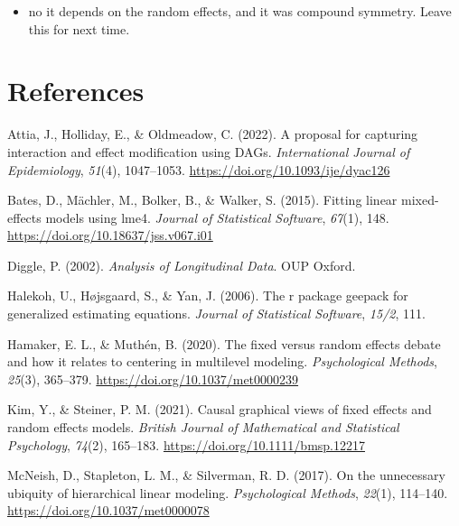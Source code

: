\documentclass[
  12pt,
  a4paper,
]{article}
\providecommand{\tightlist}{%
  \setlength{\itemsep}{0pt}\setlength{\parskip}{0pt}}\usepackage{longtable,booktabs,array}
\newlength{\cslhangindent}
\newenvironment{CSLReferences}[2] %
 {\begin{list}{}{%
  \setlength{\itemindent}{0pt}
  \setlength{\leftmargin}{0pt}
  \setlength{\parsep}{0pt}
  \ifodd #1
   \setlength{\leftmargin}{\cslhangindent}
   \setlength{\itemindent}{-1\cslhangindent}
  \fi
  \setlength{\itemsep}{#2\baselineskip}}}
 {\end{list}}
\begin{document}
\begin{itemize}
  \begin{itemize}
  \tightlist
  \item
    no it depends on the random effects, and it was compound symmetry.
    Leave this for next time.
  \end{itemize}
\end{itemize}

\newpage

\section{References}\label{references}

\label{refs}
\begin{CSLReferences}{1}{0}
Attia, J., Holliday, E., \& Oldmeadow, C. (2022). A proposal for
capturing interaction and effect modification using DAGs.
\emph{International Journal of Epidemiology}, \emph{51}(4), 1047--1053.
\url{https://doi.org/10.1093/ije/dyac126}

Bates, D., Mächler, M., Bolker, B., \& Walker, S. (2015). Fitting linear
mixed-effects models using {lme4}. \emph{Journal of Statistical
Software}, \emph{67}(1), 148.
\url{https://doi.org/10.18637/jss.v067.i01}

Diggle, P. (2002). \emph{Analysis of Longitudinal Data}. OUP Oxford.

Halekoh, U., Højsgaard, S., \& Yan, J. (2006). The r package geepack for
generalized estimating equations. \emph{Journal of Statistical
Software}, \emph{15/2}, 111.

Hamaker, E. L., \& Muthén, B. (2020). The fixed versus random effects
debate and how it relates to centering in multilevel modeling.
\emph{Psychological Methods}, \emph{25}(3), 365--379.
\url{https://doi.org/10.1037/met0000239}

Kim, Y., \& Steiner, P. M. (2021). Causal graphical views of fixed
effects and random effects models. \emph{British Journal of Mathematical
and Statistical Psychology}, \emph{74}(2), 165--183.
\url{https://doi.org/10.1111/bmsp.12217}

McNeish, D., Stapleton, L. M., \& Silverman, R. D. (2017). On the
unnecessary ubiquity of hierarchical linear modeling.
\emph{Psychological Methods}, \emph{22}(1), 114--140.
\url{https://doi.org/10.1037/met0000078}


\end{CSLReferences}
\end{document}
